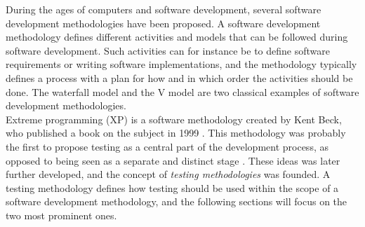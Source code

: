 
During the ages of computers and software development, several software
development methodologies have been proposed. A software development
methodology defines different activities and models that can be
followed during software development. Such activities can for instance
be to define software requirements or writing software implementations,
and the methodology typically defines a process with a plan for how and
in which order the activities should be done. The waterfall model and
the V model are two classical examples of software development
methodologies. \cite{article:sw_methodologies}\\

Extreme programming (XP) is a software methodology created by Kent Beck,
who published a book on the subject in 1999 \cite{wiki:xp}. This
methodology was probably the first to propose testing as a central part
of the development process, as opposed to being seen as a separate and
distinct stage \cite{article:sw_methodologies}. These ideas was later
further developed, and the concept of \emph{testing methodologies} was
founded. A testing methodology defines how testing should be used within
the scope of a software development methodology, and the following
sections will focus on the two most prominent ones.\\
